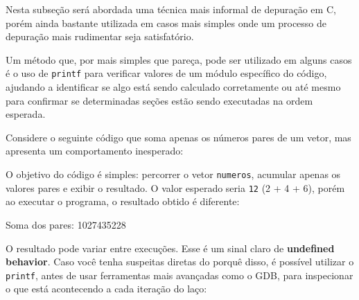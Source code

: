 Nesta subseção será abordada uma técnica mais informal de depuração em C, porém ainda bastante utilizada em casos mais simples onde um processo de depuração mais rudimentar seja satisfatório.

Um método que, por mais simples que pareça, pode ser utilizado em alguns casos é o uso de \texttt{printf} para verificar valores de um módulo específico do código, ajudando a identificar se algo está sendo calculado corretamente ou até mesmo para confirmar se determinadas seções estão sendo executadas na ordem esperada.

Considere o seguinte código que soma apenas os números pares de um vetor, mas apresenta um comportamento inesperado:


O objetivo do código é simples: percorrer o vetor \texttt{numeros}, acumular apenas os valores pares e exibir o 
resultado. O valor esperado seria \texttt{12} (2 + 4 + 6), porém ao executar o programa, o resultado obtido é diferente:

\begin{exterminal}
    Soma dos pares: 1027435228
\end{exterminal}

O resultado pode variar entre execuções. Esse é um sinal claro de \textbf{undefined behavior}. Caso você tenha suspeitas 
diretas do porquê disso, é possível utilizar o \texttt{printf}, antes de usar ferramentas mais avançadas como o GDB, 
para inspecionar o que está acontecendo a cada iteração do laço:

\newpage
{}

